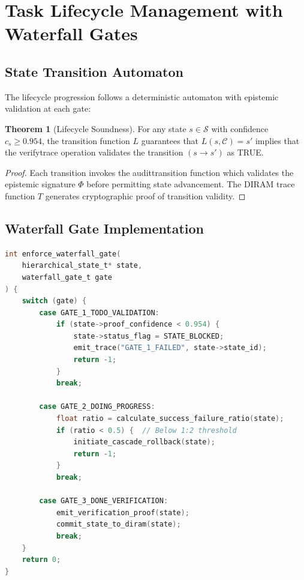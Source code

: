 \documentclass[11pt,conference]{IEEEtran}
\theoremstyle{definition}
\newtheorem{theorem}{Theorem}
\newcommand{\states}{\mathcal{S}}
\begin{document}
\section{Task Lifecycle Management with Waterfall Gates}

\subsection{State Transition Automaton}

The lifecycle progression follows a deterministic automaton with epistemic validation at each gate:

\begin{theorem}[Lifecycle Soundness]
For any state $s \in \states$ with confidence $c_s \geq 0.954$, the transition function $L$ guarantees that $L(s, \mathcal{C}) = s'$ implies that the \gls{verifytrace} operation validates the transition $(s \rightarrow s')$ as TRUE.
\end{theorem}

\begin{proof}
Each transition invokes the \gls{audittransition} function which validates the epistemic signature $\Phi$ before permitting state advancement. The DIRAM trace function $T$ generates cryptographic proof of transition validity.
\end{proof}

\subsection{Waterfall Gate Implementation}

\begin{lstlisting}[language=C,caption={Waterfall gate enforcement}]
int enforce_waterfall_gate(
    hierarchical_state_t* state, 
    waterfall_gate_t gate
) {
    switch (gate) {
        case GATE_1_TODO_VALIDATION:
            if (state->proof_confidence < 0.954) {
                state->status_flag = STATE_BLOCKED;
                emit_trace("GATE_1_FAILED", state->state_id);
                return -1;
            }
            break;
            
        case GATE_2_DOING_PROGRESS:
            float ratio = calculate_success_failure_ratio(state);
            if (ratio < 0.5) {  // Below 1:2 threshold
                initiate_cascade_rollback(state);
                return -1;
            }
            break;
            
        case GATE_3_DONE_VERIFICATION:
            emit_verification_proof(state);
            commit_state_to_diram(state);
            break;
    }
    return 0;
}
\end{lstlisting}
\end{document}

